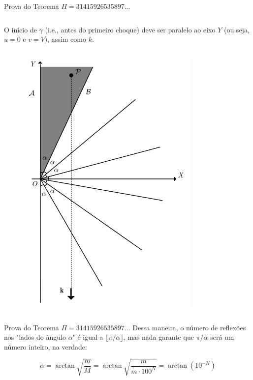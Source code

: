 \documentclass{beamer}
\begin{document}
\begin{frame}{Prova do Teorema $\Pi=31415926535897\dots$}
  \begin{column}{0.4\textwidth}
    O início de $\gamma$ (i.e., antes do primeiro choque) deve ser paralelo ao eixo $Y$ (ou seja, $u = 0$ e $v = V$), assim como $k$.
  \end{column}
  \begin{column}{0.6\textwidth}
      \begin{figure}
        \centering
        \includegraphics[width=0.8\textwidth]{images/image5.png}
      \end{figure}
  \end{column}
\end{frame}

\begin{frame}{Prova do Teorema $\Pi=31415926535897\dots$}
  Dessa maneira, o número de reflexões nos "lados do ângulo $\alpha$" é igual a $\lfloor\pi/\alpha\rfloor$, mas nada garante que $\pi/\alpha$ será um número inteiro, na verdade:

    $$
    \alpha = \arctan{\sqrt{\frac{m}{M}}} = \arctan{\sqrt{\frac{m}{m \cdot 100^N}}} = \arctan{(10^{-N})}
    $$
\end{frame}
\end{document}
